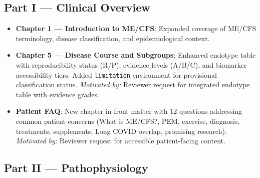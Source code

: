 \subsection*{Part I --- Clinical Overview}

\begin{itemize}

  \item \textbf{Chapter 1 --- Introduction to ME/CFS}: Expanded coverage of
    ME/CFS terminology, disease classification, and epidemiological context.

  \item \textbf{Chapter 5 --- Disease Course and Subgroups}: Enhanced endotype
    table with reproducibility status (R/P), evidence levels (A/B/C), and
    biomarker accessibility tiers. Added \texttt{limitation} environment for
    provisional classification status.
    \textit{Motivated by:} Reviewer request for integrated endotype table with
    evidence grades.

  \item \textbf{Patient FAQ}: New chapter in front matter with 12 questions
    addressing common patient concerns (What is ME/CFS?, PEM, exercise, diagnosis,
    treatments, supplements, Long COVID overlap, promising research).
    \textit{Motivated by:} Reviewer request for accessible patient-facing content.

\end{itemize}

\subsection*{Part II --- Pathophysiology}


